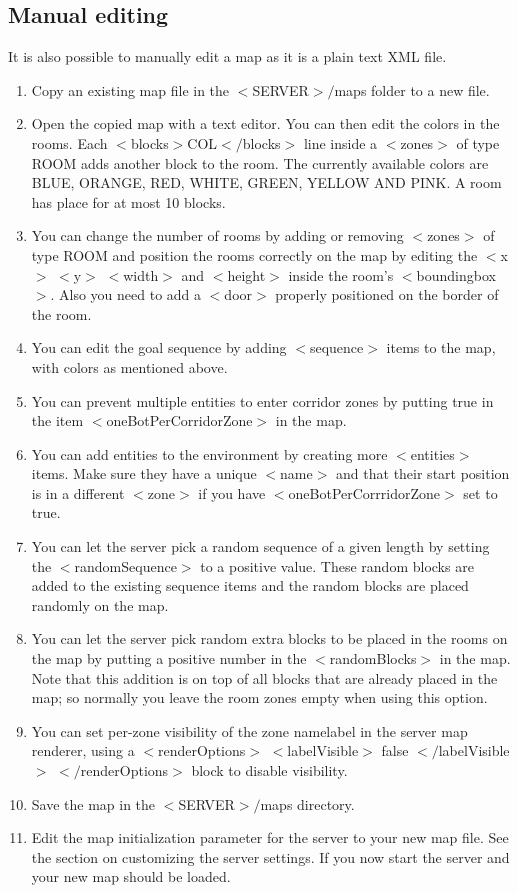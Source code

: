 \documentclass[11pt,a4paper]{article}
\begin{document}
\newpage
\subsection{Manual editing}
It is also possible to manually edit a map as it is a plain text XML file.
\begin{enumerate}
\item Copy an existing map file in the $<$SERVER$>/$maps folder to a new file.
\item Open the copied map with a text editor. You can then edit the colors in the rooms. Each $<$blocks$>$COL$</$blocks$>$ line inside a $<$zones$>$ of type ROOM adds another block to the room. The currently available colors are BLUE, ORANGE, RED, WHITE, GREEN, YELLOW AND PINK. A room has place for at most 10 blocks.
\item You can change the number of rooms by adding or removing $<$zones$>$ of type ROOM and position the rooms correctly on the map by editing the $<$x$>$ $<$y$>$ $<$width$>$ and $<$height$>$ inside the room's $<$boundingbox$>$. Also you need to add a $<$door$>$ properly positioned on the border of the room.
\item You can edit the goal sequence by adding $<$sequence$>$ items to the map, with colors as mentioned above.
\item You can prevent multiple entities to enter corridor zones by putting true in the item $<$oneBotPerCorridorZone$>$ in the map.
\item You can add entities to the environment by creating more $<$entities$>$ items. Make sure they have a unique $<$name$>$ and that their start position is in a different $<$zone$>$ if you have $<$oneBotPerCorrridorZone$>$ set to true.
\item You can let the server pick a random sequence of a given length by setting the $<$randomSequence$>$ to a positive value. These random blocks are added to the existing sequence items and the random blocks are placed randomly on the map.
\item You can let the server pick random extra blocks to be placed in the rooms on the map by putting a positive number in the $<$randomBlocks$>$ in the map. Note that this addition is on top of all blocks that are already placed in the map; so normally you leave the room zones empty when using this option.
\item You can set per-zone visibility of the zone namelabel in the server map renderer, using a $<$renderOptions$>$ $<$labelVisible$>$ false $</$labelVisible$>$ $</$renderOptions$>$ block to disable visibility.
\item Save the map in the $<$SERVER$>/$maps directory.
\item Edit the map initialization parameter for the server to your new map file. See the section on customizing the server settings. If you now start the server and your new map should be loaded.
\end{enumerate}
\end{document}
